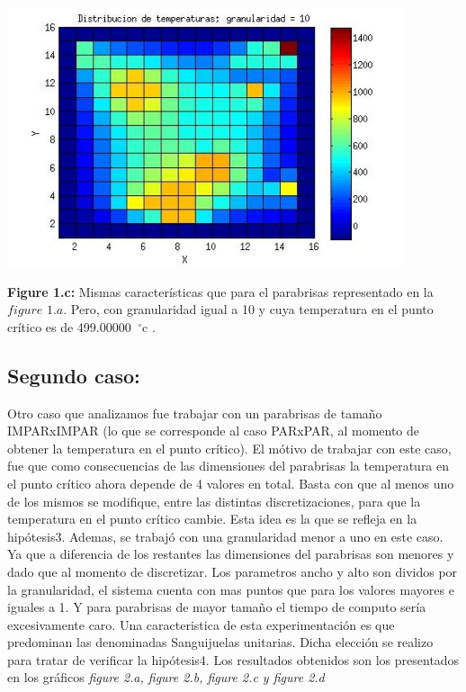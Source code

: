\documentclass[a4paper]{article}
\begin{document}
\includegraphics[width=\textwidth,height=3.0in,keepaspectratio
]{140x140h10.jpg} \newline
\begin {flushleft}
\textbf{Figure 1.c:} Mismas características que para el parabrisas representado en la $figure$ $1.a$. Pero, con granularidad igual a 10 y cuya temperatura en el punto crítico es de 499.00000\hspace{-1.5mm}$\phantom{a}^{\circ}$c .
\end{flushleft}


\subsection{Segundo caso:}



Otro caso que analizamos fue trabajar con un parabrisas de tamaño IMPARxIMPAR (lo que se corresponde al caso PARxPAR, al momento de obtener la temperatura en el punto crítico). El mótivo de trabajar con este caso, fue que como consecuencias de las dimensiones del parabrisas la temperatura en el punto crítico ahora depende de 4 valores en total. Basta con que al menos uno de los mismos se modifique, entre las distintas discretizaciones, para que la temperatura en el punto crítico cambie. Esta idea es la que se refleja en la hipótesis3.\newline
Ademas, se trabajó con una granularidad menor a uno en este caso. Ya que a diferencia de los restantes las dimensiones del parabrisas son menores y dado que al momento de discretizar. Los parametros ancho y alto son dividos por la granularidad, el sistema cuenta con mas puntos que para los valores mayores e iguales a 1. Y para parabrisas de mayor tamaño el tiempo de computo sería excesivamente caro.  
Una caracteristica de esta experimentación es que predominan las denominadas Sanguijuelas unitarias. Dicha elección se realizo para tratar de verificar la hipótesis4. Los resultados obtenidos son los presentados en los gráficos \textit{figure 2.a, figure 2.b, figure 2.c y figure 2.d}\newline
\end{document}
